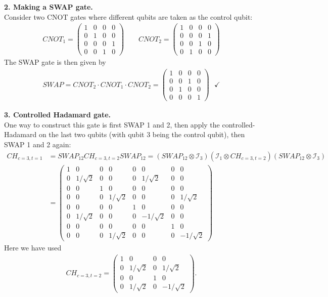 \documentclass{article}
\theoremstyle{definition}
\newcommand{\Id}{\mathcal{I}}
\begin{document}
\noindent \textbf{2. Making a SWAP gate.}\\

\noindent Consider two CNOT gates where different qubits are taken as the control qubit:
\begin{align*}
	CNOT_{1} = \begin{pmatrix}
		1 & 0 & 0 & 0 \\
		0 & 1 & 0 & 0 \\
		0 & 0 & 0 & 1 \\
		0 & 0 & 1 & 0
	\end{pmatrix} \quad\quad 
	CNOT_{2} = \begin{pmatrix}
		1 & 0 & 0 & 0 \\
		0 & 0 & 0 & 1 \\
		0 & 0 & 1 & 0 \\
		0 & 1 & 0 & 0 
	\end{pmatrix}
\end{align*}
The SWAP gate is then given by 
\begin{align*}
	SWAP = CNOT_2 \cdot  CNOT_1 \cdot  CNOT_2 = \begin{pmatrix}
		1 & 0 & 0 & 0 \\
		0 & 0 & 1 & 0 \\
		0 & 1 & 0 & 0 \\
		0 & 0 & 0 & 1
	\end{pmatrix} \,\,\,\, \checkmark
\end{align*}


\noindent \textbf{3. Controlled Hadamard gate.}\\

\noindent One way to construct this gate is first SWAP 1 and 2, then apply the controlled-Hadamard on the last two qubits (with qubit 3 being the control qubit), then SWAP 1 and 2 again:
\begin{align*}
	CH_{c=3,t=1} &= SWAP_{12} CH_{c=3,t=2} SWAP_{12} = (SWAP_{12}\otimes \Id_3) (\Id_1\otimes CH_{c=3,t=2} ) (SWAP_{12}\otimes \Id_3)\\
	&= \begin{pmatrix}
		1 &0&0&0&0&0&0&0 \\
		0& 1/\sqrt{2}&0&0&0&1/\sqrt{2}&0&0 \\
		0&0&1&0&0&0&0&0 \\
		0&0&0&1/\sqrt{2}&0&0&0&1/\sqrt{2} \\ 
		0&0&0&0&1&0&0&0 \\
		0&1/\sqrt{2}&0&0&0&-1/\sqrt{2}&0&0 \\
		0&0&0&0&0&0&1&0 \\
		0&0&0&1/\sqrt{2}&0&0&0&-1/\sqrt{2} 
	\end{pmatrix}
\end{align*}
Here we have used 
\begin{align*}
	CH_{c=3,t=2} = \begin{pmatrix}
		1 & 0 & 0 & 0 \\
		0 & 1/\sqrt{2} & 0 & 1/\sqrt{2} \\
		0 & 0 & 1 & 0 \\
		0 & 1/\sqrt{2} & 0 & -1/\sqrt{2}
	\end{pmatrix}.
\end{align*}
\end{document}
